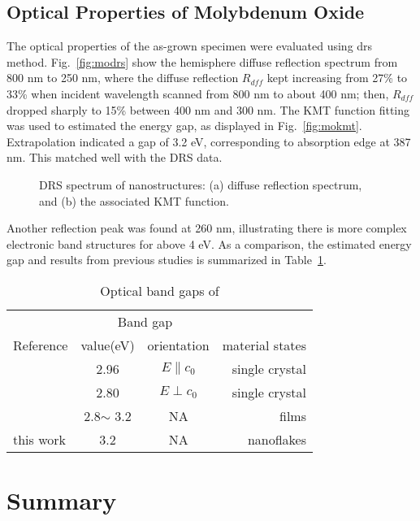 \subsection{Optical Properties of Molybdenum Oxide}

%
The optical properties of the as-grown specimen were evaluated using \gls{drs} method. Fig.~\ref{fig:modrs} show the hemisphere diffuse reflection spectrum from 800 nm to 250 nm, where the diffuse reflection $R_{dff}$ kept increasing from 27\% to 33\% when incident wavelength scanned from 800 nm to about 400 nm; then, $R_{dff}$ dropped sharply to 15\% between 400 nm and 300 nm. The KMT function fitting was used to estimated the energy gap, as displayed in Fig.~\ref{fig:mokmt}. Extrapolation indicated a gap of 3.2 eV, corresponding to absorption edge at 387 nm. This matched well with the DRS data.
\begin{figure}[htb]
\centering
{}\hspace{0.04\textwidth}
\caption[DRS spectrum of  nanostructures]{DRS spectrum of  nanostructures: (a) diffuse reflection spectrum, and (b) the associated KMT function.}
\label{fig:moo3drs}
\end{figure}
Another reflection peak was found at 260 nm, illustrating there is more complex electronic band structures for  above 4 eV. As a comparison, the estimated energy gap and results from previous studies is summarized in Table~\ref{tab:mobg}.
\begin{table}[htb]
\centering
\caption{Optical band gaps of }\label{tab:mobg}
\begin{tabular}{lccr}
\toprule
&\multicolumn{2}{c}{Band gap} \\
\cmidrule(l){2-3}
Reference & value(eV) & orientation & material states\\
\midrule
\cite{Deb1968}   & 2.96  & $E\parallel c_0$ & single crystal\\
\cite{Deb1968}   & 2.80  & $E\perp c_0$ & single crystal \\
\cite{Julien1995} & 2.8$\sim$ 3.2 & NA & films\\
 this work  & 3.2  & NA & nanoflakes\\
\bottomrule
\end{tabular}
\end{table}

\section{Summary}

